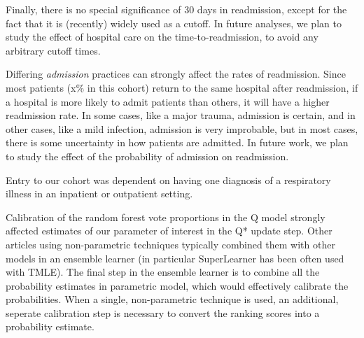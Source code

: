 \documentclass[]{article}\usepackage[]{graphicx}\usepackage[]{color}
\begin{document}
Finally, there is no special significance of 30 days in readmission, except for the fact that it is (recently) widely used as a cutoff. In future analyses, we plan to study the effect of hospital care on the time-to-readmission, to avoid any arbitrary cutoff times.   

Differing \emph{admission} practices can strongly affect the rates of readmission. Since most patients (x\% in this cohort) return to the same hospital after readmission, if a hospital is more likely to admit patients than others, it will have a higher readmission rate. In some cases, like a major trauma, admission is certain, and in other cases, like a mild infection, admission is very improbable, but in most cases, there is some uncertainty in how patients are admitted. In future work, we plan to study the effect of the probability of admission on readmission.

Entry to our cohort was dependent on having one diagnosis of a respiratory illness in an inpatient or outpatient setting. 




 


Calibration of the random forest vote proportions in the Q model strongly affected estimates of our parameter of interest in the Q* update step. Other articles using non-parametric techniques typically combined them with other models in an ensemble learner (in particular SuperLearner has been often used with TMLE). The final step in the ensemble learner is to combine all the probability estimates in parametric model, which would effectively calibrate the probabilities. When a single, non-parametric technique is used, an additional, seperate calibration step is necessary to convert the ranking scores into a probability estimate.

\printbibliography
\end{document}

